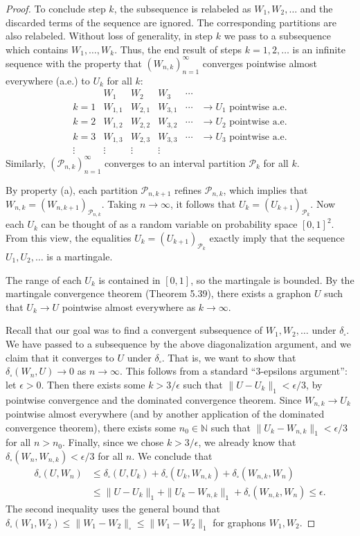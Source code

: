 \documentclass[UTF8,11pt]{ctexart}
\theoremstyle{definition}
\newcommand{\N}{\mathbb N}
\begin{document}
\begin{proof}
To conclude step $k$, the subsequence is relabeled as $W_1,W_2,\ldots$ and the discarded terms of the sequence are ignored. The corresponding partitions are also relabeled. Without loss of generality, in step $k$ we pass to a subsequence which contains $W_1,\ldots,W_k$. Thus, the end result of steps $k=1,2,\ldots$ is an infinite sequence with the property that $(W_{n,k})_{n=1}^\infty$ converges pointwise almost everywhere (a.e.) to $U_k$ for all $k$:
\[
\begin{array}{c|ccccc}
& W_1&W_2&W_3&\cdots&\\\hline
k=1&W_{1,1}&W_{2,1}&W_{3,1}&\cdots&\to U_1\text{ pointwise a.e.}\\
k=2&W_{1,2}&W_{2,2}&W_{3,2}&\cdots&\to U_2\text{ pointwise a.e.}\\
k=3&W_{1,3}&W_{2,3}&W_{3,3}&\cdots&\to U_3\text{ pointwise a.e.}\\
\vdots&\vdots&\vdots&\vdots&&
\end{array}
\]
Similarly, $(\mathcal P_{n,k})_{n=1}^\infty$ converges to an interval partition $\mathcal P_k$ for all $k$.

By property (a), each partition $\mathcal P_{n,k+1}$ refines $\mathcal P_{n,k}$, which implies that $W_{n,k}=(W_{n,k+1})_{\mathcal P_{n,k}}$. Taking $n\to\infty$, it follows that $U_k=(U_{k+1})_{\mathcal P_k}$. Now each $U_k$ can be thought of as a random variable on probability space $[0,1]^2$. From this view, the equalities $U_k=(U_{k+1})_{\mathcal P_k}$ exactly imply that the sequence $U_1,U_2,\ldots$ is a martingale.

The range of each $U_k$ is contained in $[0,1]$, so the martingale is bounded. By the martingale convergence theorem (Theorem 5.39), there exists a graphon $U$ such that $U_k\to U$ pointwise almost everywhere as $k\to\infty$.

Recall that our goal was to find a convergent subsequence of $W_1,W_2,\ldots$ under $\delta_\square$. We have passed to a subsequence by the above diagonalization argument, and we claim that it converges to $U$ under $\delta_\square$. That is, we want to show that $\delta_\square(W_n,U)\to0$ as $n\to\infty$. This follows from a standard ``3-epsilons argument'': let $\epsilon>0$. Then there exists some $k>3/\epsilon$ such that $\|U-U_k\|_1<\epsilon/3$, by pointwise convergence and the dominated convergence theorem. Since $W_{n,k}\to U_k$ pointwise almost everywhere (and by another application of the dominated convergence theorem), there exists some $n_0\in\N$ such that $\|U_k-W_{n,k}\|_1<\epsilon/3$ for all $n>n_0$. Finally, since we chose $k>3/\epsilon$, we already know that $\delta_\square(W_n,W_{n,k})<\epsilon/3$ for all $n$. We conclude that
\begin{align*}
\delta_\square(U,W_n)&\leq\delta_\square(U,U_k)+\delta_\square(U_k,W_{n,k})+\delta_\square(W_{n,k},W_n)\\
&\leq\|U-U_k\|_1+\|U_k-W_{n,k}\|_1+\delta_\square(W_{n,k},W_n)\leq\epsilon.
\end{align*}
The second inequality uses the general bound that $\delta_\square(W_1,W_2)\leq\|W_1-W_2\|_\square\leq\|W_1-W_2\|_1$ for graphons $W_1,W_2$.
\end{proof}
\end{document}
